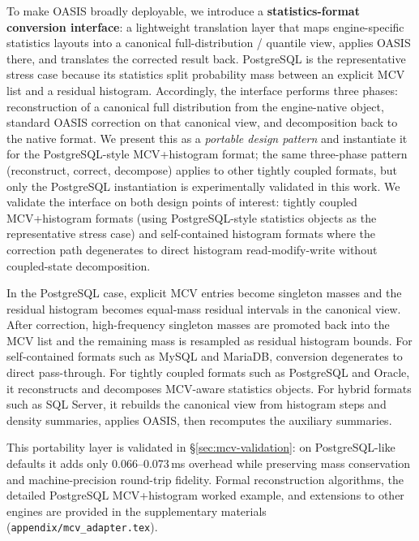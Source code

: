 \documentclass[runningheads]{llncs}
\begin{document}
To make OASIS broadly deployable, we introduce a \textbf{statistics-format
conversion interface}: a lightweight translation layer that maps engine-specific
statistics layouts into a canonical full-distribution / quantile view, applies
OASIS there, and translates the corrected result back.
PostgreSQL is the representative stress case because its statistics split
probability mass between an explicit MCV list and a residual histogram.
Accordingly, the interface performs three phases: reconstruction of a canonical
full distribution from the engine-native object, standard OASIS correction on
that canonical view, and decomposition back to the native format.
We present this as a \emph{portable design pattern} and instantiate it for the
PostgreSQL-style MCV+histogram format; the same three-phase pattern (reconstruct,
correct, decompose) applies to other tightly coupled formats, but only the
PostgreSQL instantiation is experimentally validated in this work. We validate the interface on both design points of interest:
tightly coupled MCV+histogram formats (using PostgreSQL-style statistics objects as the representative stress case) and
self-contained histogram formats where the correction path degenerates to direct histogram read-modify-write
without coupled-state decomposition.

In the PostgreSQL case, explicit MCV entries become singleton masses and the
residual histogram becomes equal-mass residual intervals in the canonical view.
After correction, high-frequency singleton masses are promoted back into the
MCV list and the remaining mass is resampled as residual histogram bounds.
For self-contained formats such as MySQL and MariaDB, conversion degenerates to
direct pass-through. For tightly coupled formats such as PostgreSQL and Oracle,
it reconstructs and decomposes MCV-aware statistics objects. For hybrid formats
such as SQL Server, it rebuilds the canonical view from histogram steps and
density summaries, applies OASIS, then recomputes the auxiliary summaries.

This portability layer is validated in \S\ref{sec:mcv-validation}: on
PostgreSQL-like defaults it adds only 0.066--0.073\,ms overhead while
preserving mass conservation and machine-precision round-trip fidelity.
Formal reconstruction algorithms, the detailed PostgreSQL MCV+histogram
worked example, and extensions to other engines are provided
in the supplementary materials (\texttt{appendix/mcv\_adapter.tex}).


\end{document}

